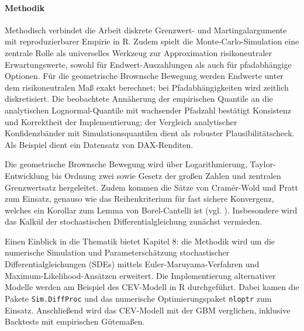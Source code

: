 \paragraph{Methodik}
Methodisch verbindet die Arbeit diskrete Grenzwert- und Martingalargumente mit 
reproduzierbarer Empirie in R. Zudem spielt die Monte-Carlo-Simulation eine zentrale Rolle als universelles 
Werkzeug zur Approximation risikoneutraler Erwartungswerte,
sowohl für Endwert-Auszahlungen als auch für pfadabhängige Optionen. Für die geometrische Brownsche 
Bewegung werden Endwerte unter dem risikoneutralen Maß exakt berechnet; bei Pfadabhängigkeiten wird zeitlich diskretisiert.
Die beobachtete Annäherung der empirischen Quantile an die analytischen Lognormal-Quantile mit wachsender Pfadzahl bestätigt 
Konsistenz und Korrektheit der Implementierung; der Vergleich analytischer Konfidenzbänder mit Simulationsquantilen dient als robuster Plausibilitätscheck.
Als Beispiel dient ein Datensatz von DAX-Renditen.

Die geometrische Brownsche Bewegung wird über Logarithmierung, Taylor-Entwicklung bis Ordnung zwei sowie Gesetz der großen Zahlen und 
zentralen Grenzwertsatz hergeleitet. Zudem kommen die Sätze von Cramér-Wold und Pratt zum Einsatz, 
genauso wie das Reihenkriterium für fast sichere Konvergenz, welches 
ein Korollar zum Lemma von Borel-Cantelli ist (vgl. \cite{henze}). Insbesondere wird das Kalkül der stochastischen Differentialgleichung zunächst vermieden.

Einen Einblick in die Thematik bietet Kapitel 8: die Methodik wird um die numerische Simulation und Parameterschätzung stochastischer Differentialgleichungen (SDEs) mittels Euler-Maruyama-Verfahren und Maximum-Likelihood-Ansätzen erweitert. 
Die Implementierung alternativer Modelle werden am Beispiel des CEV-Modell in R durchgeführt.
Dabei kamen die Pakete \texttt{Sim.DiffProc} und das numerische Optimierungspaket \texttt{nloptr} zum Einsatz.
Anschließend wird das CEV-Modell mit der GBM verglichen, inklusive Backtests mit empirischen Gütemaßen.
